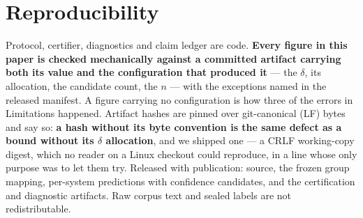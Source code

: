 \documentclass[11pt]{article}
\begin{document}
\section*{Reproducibility}

Protocol, certifier, diagnostics and claim ledger are code. \textbf{Every figure in this paper is
checked mechanically against a committed artifact carrying both its value and the configuration
that produced it} --- the $\delta$, its allocation, the candidate count, the $n$ --- with the
exceptions named in the released manifest. A figure carrying no configuration is how three of the
errors in Limitations happened. Artifact hashes are pinned over
git-canonical (LF) bytes and say so: \textbf{a hash without its byte convention is the same defect
as a bound without its $\delta$ allocation}, and we shipped one --- a CRLF working-copy digest,
which no reader on a Linux checkout could reproduce, in a line whose only purpose was to let them
try. Released with publication: source, the frozen group mapping, per-system
predictions with confidence candidates, and the certification and diagnostic artifacts. Raw corpus
text and sealed labels are not redistributable.


\end{document}
